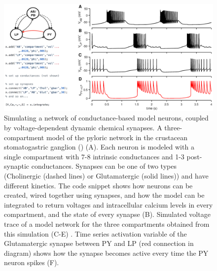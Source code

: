 \documentclass{frontiersSCNS} %
\begin{document}
\begin{figure}[!htb]
	\centering
	\includegraphics[width=1.0\linewidth]{gfx/figure_network}
	\caption{Simulating a network of conductance-based model neurons, coupled by voltage-dependent dynamic chemical synapses.  A three-compartment model of the pyloric network in the crustacean stomatogastric ganglion (\cite{prinzSimilarNetworkActivity2004}) (A). Each neuron is modeled with a single compartment with 7-8 intrinsic conductances and 1-3 post-synaptic conductances. Synapses can be one of two types (Cholinergic (dashed lines) or Glutamatergic (solid lines)) and have different kinetics.  The code snippet shows how neurons can be created, wired together using synapses, and how the model can be integrated to return voltages and intracellular calcium levels in every compartment, and the state of every synapse (B). Simulated voltage trace of a model network for the three compartments obtained from this simulation (C-E) . Time series activation variable of the Glutamatergic synapse between PY and LP (red connection in diagram) shows how the synapse becomes active every time the PY neuron spikes (F).}
	\label{fig:figurenetwork}
\end{figure}



\clearpage
\end{document}
